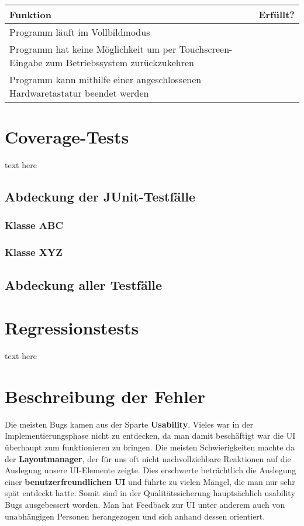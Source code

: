 \documentclass{article}
\newcommand{\cmark}{\ding{51}}
\begin{document}
    \begin{table}[H]
      \begin{tabularx}{\textwidth}{| >{\raggedright\arraybackslash}X | c |}
        \hline
        \textbf{Funktion} & \textbf{Erfüllt?} \\
        \hline
        Programm läuft im Vollbildmodus & \cmark \\
        \hline
        Programm hat keine Möglichkeit um per Touchscreen-Eingabe zum Betriebssystem zurückzukehren & \cmark \\
        \hline
        Programm kann mithilfe einer angeschlossenen Hardwaretastatur beendet werden & \cmark \\
        \hline
      \end{tabularx}
    \end{table}

\section{Coverage-Tests}
text here
  \subsection{Abdeckung der JUnit-Testfälle}
    \subsubsection{Klasse ABC}
    \subsubsection{Klasse XYZ}
  \subsection{Abdeckung aller Testfälle}

\section{Regressionstests}
text here

\section{Beschreibung der Fehler}
  Die meisten Bugs kamen aus der Sparte \textbf{Usability}. Vieles war in der Implementierungsphase nicht zu entdecken, da man damit beschäftigt
  war die UI überhaupt zum funktionieren zu bringen. Die meisten Schwierigkeiten machte da der \textbf{Layoutmanager}, der für uns oft nicht
  nachvollziehbare Reaktionen auf die Auslegung unsere UI-Elemente zeigte.\newline 
  Dies erschwerte beträchtlich die Auslegung einer \textbf{benutzerfreundlichen UI} und führte zu vielen Mängel, die man
  nur sehr spät entdeckt hatte. Somit sind in der Qualitätssicherung hauptsächlich usability Bugs ausgebessert worden. 
  Man hat Feedback zur UI unter anderem auch von unabhängigen Personen herangezogen und sich anhand dessen orientiert. 
  
\end{document}
